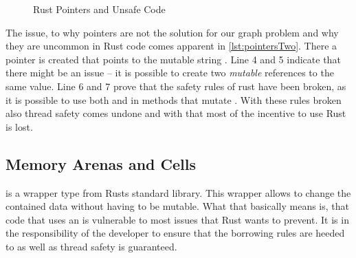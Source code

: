 \documentclass[thesis]{subfiles}
\begin{document}
    \newsavebox{\pointersOne}
    \begin{lrbox}{\pointersOne}%
      \begin{minipage}{.44\linewidth}
        
      \end{minipage}
    \end{lrbox}

    \newsavebox{\pointersTwo}
    \begin{lrbox}{\pointersTwo}
      \begin{minipage}{.49\linewidth}
        
      \end{minipage}
    \end{lrbox}

    \begin{figure}[ht]
      \captionsetup{type=lstlisting}
       \hfill%
      \caption{Rust Pointers and Unsafe Code}\label{lst:pointers}
    \end{figure}

    The issue, to why pointers are not the solution for our graph problem and why they are uncommon in Rust code comes apparent in \autoref{lst:pointersTwo}.
    There a pointer  is created that points to the mutable string .
    Line 4 and 5 indicate that there might be an issue -- it is possible to create two \emph{mutable} references to the same value.
    Line 6 and 7 prove that the safety rules of rust have been broken, as it is possible to use both  and  in methods that mutate .
    With these rules broken also thread safety comes undone and with that most of the incentive to use Rust is lost.

  \subsection{Memory Arenas and Cells}\label{ssec:cell}
     is a wrapper type from Rusts standard library.
    This wrapper allows to change the contained data without having to be mutable.
    What that basically means is, that code that uses an  is vulnerable to most issues that Rust wants to prevent.
    It is in the responsibility of the developer to ensure that the borrowing rules are heeded to as well as thread safety is guaranteed.\autocite{rust-doc}
\end{document}
